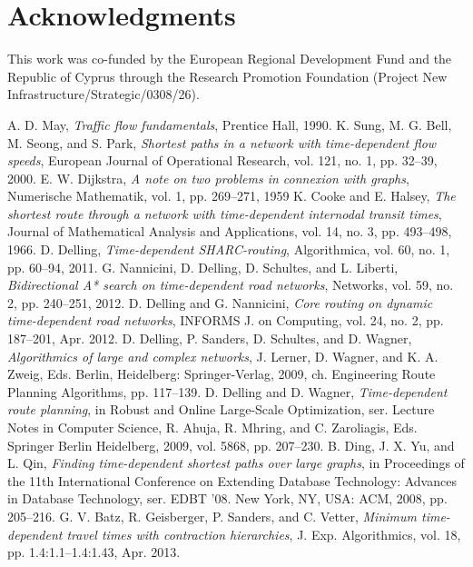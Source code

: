 \documentclass[conference]{IEEEtran}
\begin{document}
\section*{Acknowledgments}

This  work  was  co-funded  by  the  European  Regional  Development  Fund
and  the  Republic  of  Cyprus  through  the  Research  Promotion  Foundation  (Project
New  Infrastructure/Strategic/0308/26).


\begin{thebibliography}{99}
 A. D. May, {\it Traffic flow fundamentals}, Prentice Hall, 1990.
 K. Sung, M. G. Bell, M. Seong, and S. Park, {\it Shortest paths in a network with time-dependent flow speeds}, European Journal of Operational Research, vol. 121, no. 1, pp. 32–39, 2000.
 E. W. Dijkstra, {\it A note on two problems in connexion with graphs}, Numerische Mathematik, vol. 1, pp. 269–271, 1959
 K. Cooke and E. Halsey, {\it The shortest route through a network with time-dependent internodal transit times}, Journal of Mathematical Analysis and Applications, vol. 14, no. 3, pp. 493–498, 1966.
 D. Delling, {\it Time-dependent SHARC-routing}, Algorithmica, vol. 60, no. 1, pp. 60–94, 2011.
 G. Nannicini, D. Delling, D. Schultes, and L. Liberti, {\it Bidirectional A* search on time-dependent road networks}, Networks, vol. 59, no. 2, pp. 240–251, 2012.
 D. Delling and G. Nannicini, {\it Core routing on dynamic time-dependent road networks}, INFORMS J. on Computing, vol. 24, no. 2, pp. 187–201, Apr. 2012.
 D. Delling, P. Sanders, D. Schultes, and D. Wagner, {\it Algorithmics of large and complex networks}, J. Lerner, D. Wagner, and K. A. Zweig, Eds. Berlin,
Heidelberg: Springer-Verlag, 2009, ch. Engineering Route Planning Algorithms, pp. 117–139.
 D. Delling and D. Wagner, {\it Time-dependent route planning}, in Robust and Online Large-Scale Optimization, ser. Lecture Notes in Computer Science, R. Ahuja, R. Mhring, and C. Zaroliagis, Eds. Springer Berlin Heidelberg, 2009, vol. 5868, pp. 207–230.
 B. Ding, J. X. Yu, and L. Qin, {\it Finding time-dependent shortest paths over large graphs}, in Proceedings of the 11th International Conference on Extending Database Technology: Advances in Database Technology, ser. EDBT ’08. New York, NY, USA: ACM, 2008, pp. 205–216.
 G. V. Batz, R. Geisberger, P. Sanders, and C. Vetter, {\it Minimum time-dependent travel times with contraction hierarchies}, J. Exp. Algorithmics, vol. 18, pp. 1.4:1.1–1.4:1.43, Apr. 2013.

\end{thebibliography}
\end{document}
